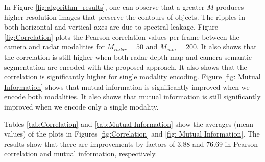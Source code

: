 \par In Figure \ref{fig:algorithm_results}, one can observe that a greater $M$ produces higher-resolution images that preserve the contours of objects. The ripples in both horizontal and vertical axes are due to spectral leakage. Figure \ref{fig:Correlation} plots the Pearson correlation values per frame between the camera and radar modalities for $M_{radar}=50$ and $M_{cam}=200$. It also shows that the correlation is still higher when both radar depth map and camera semantic segmentation are encoded with the proposed approach. It also shows that the correlation is significantly higher for single modality encoding. Figure \ref{fig: Mutual Information} shows that mutual information is significantly improved when we encode both modalities. It also shows that mutual information is still significantly improved when we encode only a single modality.

\par Tables \ref{tab:Correlation} and \ref{tab:Mutual Information} show the averages (mean values) of the plots in Figures \ref{fig:Correlation} and \ref{fig: Mutual Information}. The results show that there are improvements by factors of 3.88 and 76.69 in Pearson correlation and mutual information, respectively.
\vspace{-3px}



